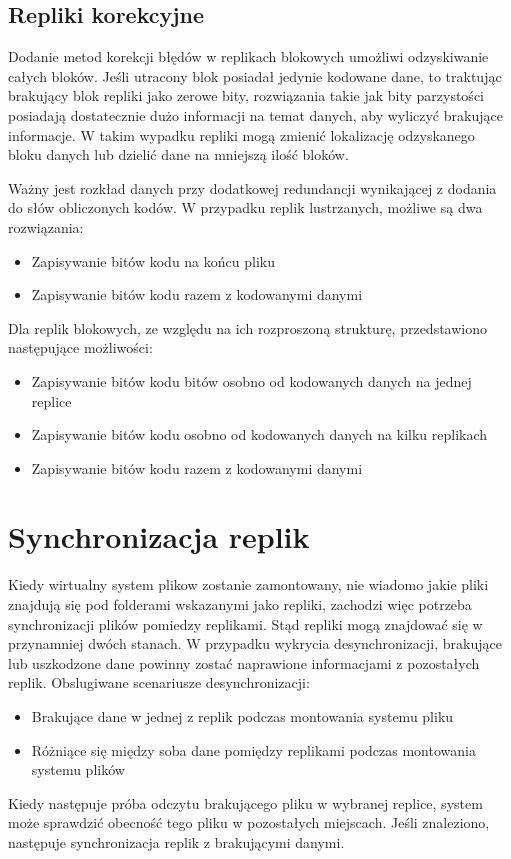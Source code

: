 \subsection{Repliki korekcyjne}
Dodanie metod korekcji błędów w replikach blokowych umożliwi odzyskiwanie całych bloków. Jeśli utracony blok posiadał jedynie kodowane dane, to traktując brakujący blok repliki jako zerowe bity, rozwiązania takie jak bity parzystości posiadają dostatecznie dużo informacji na temat danych, aby wyliczyć brakujące informacje. W takim wypadku repliki mogą zmienić lokalizację odzyskanego bloku danych lub dzielić dane na mniejszą ilość bloków. 

Ważny jest rozkład danych przy dodatkowej redundancji wynikającej z dodania do słów obliczonych kodów. W przypadku replik lustrzanych, możliwe są dwa rozwiązania:
\begin{itemize}
        \item Zapisywanie bitów kodu na końcu pliku
        \item Zapisywanie bitów kodu razem z kodowanymi danymi
\end{itemize}
Dla replik blokowych, ze względu na ich rozproszoną strukturę, przedstawiono następujące możliwości:
\begin{itemize}
        \item Zapisywanie bitów kodu bitów osobno od kodowanych danych na jednej replice
        \item Zapisywanie bitów kodu osobno od kodowanych danych na kilku replikach
        \item Zapisywanie bitów kodu razem z kodowanymi danymi
\end{itemize}

\section {Synchronizacja replik}
Kiedy wirtualny system plikow zostanie zamontowany, nie wiadomo jakie pliki znajdują się pod folderami wskazanymi jako repliki, zachodzi więc potrzeba synchronizacji plików pomiedzy replikami. Stąd repliki mogą znajdować się w przynamniej dwóch stanach. W przypadku wykrycia desynchronizacji, brakujące lub uszkodzone dane powinny zostać naprawione informacjami z pozostałych replik. Obslugiwane scenariusze desynchronizacji:
\begin{itemize}
    \item Brakujące dane w jednej z replik podczas montowania systemu pliku
    \item Różniące się między soba dane pomiędzy replikami podczas montowania systemu plików
\end{itemize}
Kiedy następuje próba odczytu brakującego pliku w wybranej replice, system może sprawdzić obecność tego pliku w pozostałych miejscach. Jeśli znaleziono, następuje synchronizacja replik z brakującymi danymi. 

